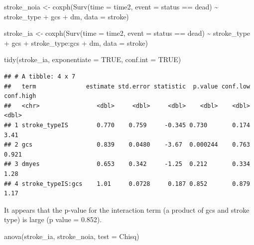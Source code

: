\documentclass[
  10pt,
]{krantz}
\newenvironment{Shaded}{\begin{snugshade}}{\end{snugshade}}
\newcommand{\AttributeTok}[1]{\textcolor[rgb]{0.77,0.63,0.00}{#1}}
\newcommand{\ConstantTok}[1]{\textcolor[rgb]{0.00,0.00,0.00}{#1}}
\newcommand{\FunctionTok}[1]{\textcolor[rgb]{0.00,0.00,0.00}{#1}}
\newcommand{\NormalTok}[1]{#1}
\newcommand{\OtherTok}[1]{\textcolor[rgb]{0.56,0.35,0.01}{#1}}
\newcommand{\SpecialCharTok}[1]{\textcolor[rgb]{0.00,0.00,0.00}{#1}}
\newcommand{\StringTok}[1]{\textcolor[rgb]{0.31,0.60,0.02}{#1}}
\begin{document}
\begin{Shaded}
\begin{Highlighting}[]
\NormalTok{stroke\_noia }\OtherTok{\textless{}{-}} 
  \FunctionTok{coxph}\NormalTok{(}\FunctionTok{Surv}\NormalTok{(}\AttributeTok{time =}\NormalTok{ time2, }
             \AttributeTok{event =}\NormalTok{ status }\SpecialCharTok{==} \StringTok{\textquotesingle{}dead\textquotesingle{}}\NormalTok{) }\SpecialCharTok{\textasciitilde{}}\NormalTok{ stroke\_type }\SpecialCharTok{+}\NormalTok{ gcs }\SpecialCharTok{+}\NormalTok{ dm, }
        \AttributeTok{data =}\NormalTok{ stroke)}

\NormalTok{stroke\_ia }\OtherTok{\textless{}{-}} 
  \FunctionTok{coxph}\NormalTok{(}\FunctionTok{Surv}\NormalTok{(}\AttributeTok{time =}\NormalTok{ time2, }
             \AttributeTok{event =}\NormalTok{ status }\SpecialCharTok{==} \StringTok{\textquotesingle{}dead\textquotesingle{}}\NormalTok{) }\SpecialCharTok{\textasciitilde{}}\NormalTok{ stroke\_type }\SpecialCharTok{+}\NormalTok{ gcs }\SpecialCharTok{+}\NormalTok{ stroke\_type}\SpecialCharTok{:}\NormalTok{gcs }\SpecialCharTok{+}\NormalTok{ dm, }
        \AttributeTok{data =}\NormalTok{ stroke)}

\FunctionTok{tidy}\NormalTok{(stroke\_ia, }\AttributeTok{exponentiate =} \ConstantTok{TRUE}\NormalTok{, }\AttributeTok{conf.int =} \ConstantTok{TRUE}\NormalTok{)}
\end{Highlighting}
\end{Shaded}

\begin{verbatim}
## # A tibble: 4 x 7
##   term              estimate std.error statistic  p.value conf.low conf.high
##   <chr>                <dbl>     <dbl>     <dbl>    <dbl>    <dbl>     <dbl>
## 1 stroke_typeIS        0.770    0.759     -0.345 0.730       0.174     3.41 
## 2 gcs                  0.839    0.0480    -3.67  0.000244    0.763     0.921
## 3 dmyes                0.653    0.342     -1.25  0.212       0.334     1.28 
## 4 stroke_typeIS:gcs    1.01     0.0728     0.187 0.852       0.879     1.17
\end{verbatim}

It appears that the p-value for the interaction term (a product of gcs and stroke type) is large (p value = 0.852).

\begin{Shaded}
\begin{Highlighting}[]
\FunctionTok{anova}\NormalTok{(stroke\_ia, stroke\_noia, }\AttributeTok{test =} \StringTok{\textquotesingle{}Chisq\textquotesingle{}}\NormalTok{)}
\end{Highlighting}
\end{Shaded}
\end{document}
